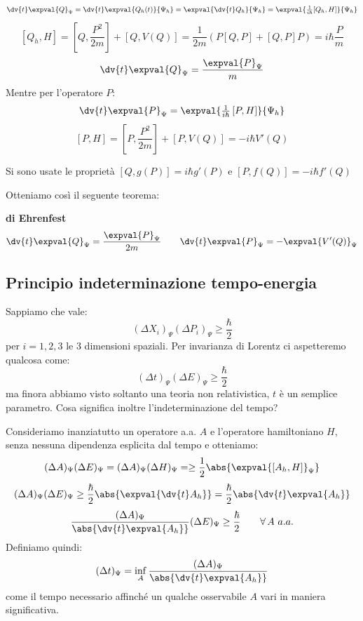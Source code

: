 \[
\dv{t} \expval{Q}_{\Psi}
= \dv{t}\expval{Q_h(t)}{\Psi_h}
= \expval{\dv{t} Q_h}{\Psi_h}
= \expval{\tfrac{1}{i\hbar}[Q_h, H]}{\Psi_h}
\]
\[
    \left[ Q_h, H \right]  = \left[ Q, \frac{P^2}{2m} \right] + \left[ Q, V(Q) \right] = \frac{1}{2m}\left( P\left[ Q,P \right] + [Q,P]P \right) = i\hbar \frac{P}{m}
\]
\[
    \dv{t} \expval{Q}_{\Psi} = \frac{\expval{P}_\Psi}{m}
\]
Mentre per l'operatore \(P\):
\[
    \dv{t} \expval{P}_\Psi  = \expval{\tfrac{1}{i\hbar}\left[ P, H \right]}{\Psi_h}
\]
\[
    \left[ P,H  \right]= \left[ P, \frac{P^2}{2m} \right] + \left[ P, V(Q) \right]  = -i\hbar V'(Q)
\]
\begin{attention}
    Si sono usate le proprietà \(\left[ Q, g(P) \right]= i \hbar g'(P)\)  e \(\left[ P, f(Q) \right]= -i\hbar f'(Q)\)
\end{attention}

Otteniamo così il seguente teorema:

\begin{theorem} \label{theo: Ehrenfest}
    {\normalfont\textbf{di Ehrenfest}}
    \begin{equation}
        \dv{t}\expval{Q}_{\Psi} = \frac{\expval{P}_\Psi}{2m} \qquad \dv{t}\expval{P}_\Psi = - \expval{V'(Q)}_{\Psi}
    \end{equation}
\end{theorem}


\subsection{Principio indeterminazione tempo-energia}

Sappiamo che vale: 
\[
    (\Delta X_i )_{\Psi} (\Delta P_i )_\Psi \geq \frac{\hbar}{2}
\]
per \(i = 1,2,3\) le 3 dimensioni spaziali. Per invarianza di Lorentz ci aspetteremo qualcosa come:
\begin{equation}
    (\Delta t)_{\Psi}(\Delta E)_\Psi \geq \frac{\hbar}{2}
\end{equation}
ma finora abbiamo visto soltanto una teoria non relativistica, \(t\) è un semplice parametro. Cosa significa inoltre l'indeterminazione del tempo?

Consideriamo inanziatutto un operatore a.a. \(A\) e l'operatore hamiltoniano \(H\), senza nessuna dipendenza esplicita dal tempo e otteniamo:
\[
    (\Delta A)_{\Psi} (\Delta E)_\Psi = (\Delta A)_{\Psi} (\Delta H)_\Psi = \geq \frac{1}{2} \abs{\expval{\left[ A_h,H \right]}_\Psi}
\]
\[
    (\Delta A)_{\Psi} (\Delta E)_\Psi  \geq \frac{\hbar}{2}\abs{\expval{\dv{t}A_h}} =\frac{\hbar}{2}\abs{\dv{t}\expval{A_h}}
\]
\[
    \frac{ (\Delta A)_{\Psi} }{\abs{\dv{t}\expval{A_h}}}(\Delta E)_\Psi  \geq \frac{\hbar}{2} \qquad    \forall \, A \ a.a.
\]
Definiamo quindi:
\begin{equation}
    (\Delta t)_{\Psi} =  \inf_{A} \frac{ (\Delta A)_{\Psi} }{\abs{\dv{t}\expval{A_h}}}
\end{equation}
come il tempo necessario affinché un qualche osservabile \(A\) vari in maniera significativa.


